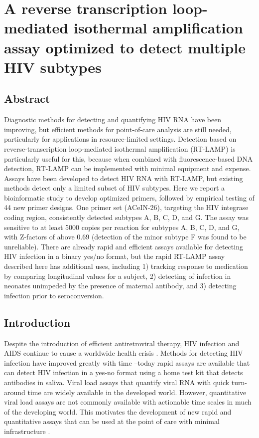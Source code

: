 \documentclass[../sherrill-Mix_thesis.tex]{subfiles}
\begin{document}
\graphicspath{{im/}{lamp/im/}}

\chapter{A reverse transcription loop-mediated isothermal amplification assay optimized to detect multiple HIV subtypes}
\label{chapLamp}

\section{Abstract}

	Diagnostic methods for detecting and quantifying HIV RNA have been improving, but efficient methods for point-of-care analysis are still needed, particularly for applications in resource-limited settings. Detection based on reverse-transcription loop-mediated isothermal amplification (RT-LAMP) is particularly useful for this, because when combined with fluorescence-based DNA detection, RT-LAMP can be implemented with minimal equipment and expense. Assays have been developed to detect HIV RNA with RT-LAMP, but existing methods detect only a limited subset of HIV subtypes. Here we report a bioinformatic study to develop optimized primers, followed by empirical testing of 44 new primer designs. One primer set (ACeIN-26), targeting the HIV integrase coding region, consistently detected subtypes A, B, C, D, and G. The assay was sensitive to at least 5000 copies per reaction for subtypes A, B, C, D, and G, with Z-factors of above 0.69 (detection of the minor subtype F was found to be unreliable). There are already rapid and efficient assays available for detecting HIV infection in a binary yes/no format, but the rapid RT-LAMP assay described here has additional uses, including 1) tracking response to medication by comparing longitudinal values for a subject, 2) detecting of infection in neonates unimpeded by the presence of maternal antibody, and 3) detecting infection prior to seroconversion.

\section{Introduction}
	Despite the introduction of efficient antiretroviral therapy, HIV infection and AIDS continue to cause a worldwide health crisis \citep{Murray2014}. Methods for detecting HIV infection have improved greatly with time \citep{Sollis2014}--today rapid assays are available that can detect HIV infection in a yes-no format using a home test kit that detects antibodies in saliva. Viral load assays that quantify viral RNA with quick turn-around time are widely available in the developed world. However, quantitative viral load assays are not commonly available with actionable time scales in much of the developing world. This motivates the development of new rapid and quantitative assays that can be used at the point of care with minimal infrastructure \citep{Liu2013,Curtis2012}.
\end{document}
